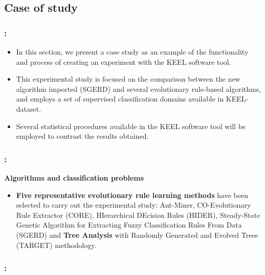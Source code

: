 \documentclass{beamer}
\begin{document}
\begin{CJK*}{UTF8}{bsmi}
\subsection{Case of study}

\begin{frame}
	\frametitle{\insertsection : \insertsubsection}
	
	
	\begin{itemize}
		\item In this section, we present a case study as an example of the functionality and process of creating an experiment with the KEEL software tool.
		\item This experimental study is focused on the comparison between the new algorithm imported (SGERD) and several evolutionary rule-based algorithms, and employs a set of supervised classification domains available in KEEL-dataset.
		\item Several statistical procedures available in the KEEL software tool will be employed to contrast the results obtained.
	\end{itemize}
	
	
\end{frame}

\begin{frame}
	\frametitle{\insertsection : \insertsubsection}
	\textbf{Algorithms and classification problems}
	
	\begin{itemize}
		\item \textbf{Five representative evolutionary rule learning methods} have been selected to carry out the experimental study: Ant-Miner, CO-Evolutionary Rule Extractor (CORE), HIerarchical DEcision Rules (HIDER), Steady-State Genetic Algorithm for Extracting Fuzzy Classification Rules From Data (SGERD) and \textbf{Tree Analysis }with Randomly Generated and Evolved Trees (TARGET) methodology.
	\end{itemize}
	
	
\end{frame}

\begin{frame}
	\frametitle{\insertsection : \insertsubsection}
	

\end{frame}
\end{CJK*}
\end{document}
